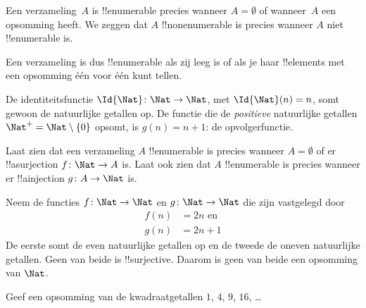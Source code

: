 \documentclass[../../../include/open-logic-section]{subfiles}
\begin{document}
\begin{defn}
  Een verzameling~$A$ is !!{enumerable} precies wanneer $A =
  \emptyset$ of wanneer~$A$ een opsomming heeft. We zeggen dat $A$
  !!{nonenumerable} is precies wanneer $A$ niet !!{enumerable} is.
\end{defn}

\begin{explain}
Een verzameling is dus !!{enumerable} als zij leeg is of als je haar
!!{element}s met een opsomming één voor één kunt tellen.
\end{explain}

\begin{ex}
De identiteitsfunctie $\Id{\Nat} \colon \Nat \to \Nat$, met
$\Id{\Nat}(n) = n$, somt gewoon de natuurlijke getallen op. De functie
die de \emph{positieve} natuurlijke getallen $\Nat^+ = \Nat \setminus
\{0\}$ opsomt, is $g(n) = n + 1$: de opvolgerfunctie.
\end{ex}

\begin{prob}
Laat zien dat een verzameling $A$ !!{enumerable} is precies wanneer
$A = \emptyset$ of er !!a{surjection} $f\colon \Nat \to A$ is. Laat
ook zien dat $A$ !!{enumerable} is precies wanneer er !!a{injection}
$g\colon A \to \Nat$ is.
\end{prob}

\begin{ex}
Neem de functies $f\colon \Nat \to \Nat$ en $g \colon \Nat \to \Nat$
die zijn vastgelegd door
\begin{align*}
  f(n) & = 2n \text{ en}\\
  g(n) & = 2n+1
\end{align*}
De eerste somt de even natuurlijke getallen op en de tweede de oneven
natuurlijke getallen. Geen van beide is !!{surjective}. Daarom is
geen van beide een opsomming van $\Nat$.
\end{ex}

\begin{prob}
Geef een opsomming van de kwadraatgetallen $1$, $4$, $9$, $16$, \dots
\end{prob}
\end{document}

